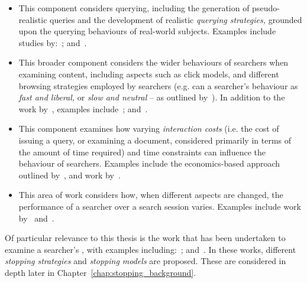 \begin{itemize}
    \item{ This component considers querying, including the generation of pseudo-realistic queries and the development of realistic \emph{querying strategies,} grounded upon the querying behaviours of real-world subjects. Examples include studies by:~\cite{azzopardi2009query_side, azzopardi2007languages, carterette2015test_collections, jordan2006cqg, keskustalo2009querying, hagen2015query_generation}; and~\cite{verberne2015personalised_queries}.}
    
    \item{ This broader component considers the wider behaviours of searchers when examining content, including aspects such as click models, and different browsing strategies employed by searchers (e.g. can a searcher's behaviour as \emph{fast and liberal,} or \emph{slow and neutral} -- as outlined by~\cite{smucker2011user_strategies}). In addition to the work by~\cite{smucker2011user_strategies}, examples include~\cite{carterette2015test_collections, chuklin2015click_models, guo2009click_chain}; and~\cite{pakkonen2015behavioural_dimensions}.}
    
    \item{ This component examines how varying \emph{interaction costs} (i.e. the cost of issuing a query, or examining a document, considered primarily in terms of the amount of time required) and time constraints can influence the behaviour of searchers. Examples include the economics-based approach outlined by~\cite{azzopardi2011economics}, and work by~\cite{baskaya2012simulating_sessions}.}
    
    \item{ This area of work considers how, when different aspects are changed, the performance of a searcher over a search session varies. Examples include work by~\cite{luo2014winwin} and~\cite{luo2015pomdp}.}
\end{itemize}

Of particular relevance to this thesis is the work that has been undertaken to examine a searcher's , with examples including:~\cite{carterette2015test_collections, maxwell2015initial_stopping, maxwell2015stopping_strategies}; and~\cite{thomas2014modelling_behaviour}. In these works, different \emph{stopping strategies} and \emph{stopping models} are proposed. These are considered in depth later in Chapter~\ref{chap:stopping_background}.

